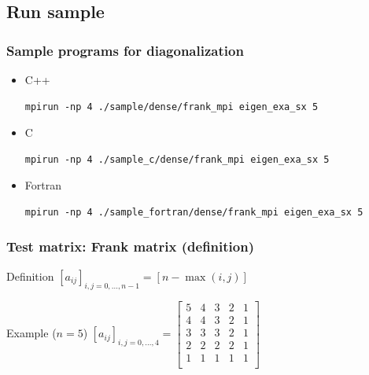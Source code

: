 \subsection{Run sample}

\begin{frame}[c,fragile]
  \frametitle{Sample programs for diagonalization}
  \begin{itemize}
  \item C++ 
\begin{lstlisting}[style=shstyle]
mpirun -np 4 ./sample/dense/frank_mpi eigen_exa_sx 5
\end{lstlisting}
  \item C 
\begin{lstlisting}[style=shstyle]
mpirun -np 4 ./sample_c/dense/frank_mpi eigen_exa_sx 5
\end{lstlisting}
  \item Fortran 
\begin{lstlisting}[style=shstyle]
mpirun -np 4 ./sample_fortran/dense/frank_mpi eigen_exa_sx 5
\end{lstlisting}

  \end{itemize}
\end{frame}

\begin{frame}[c,fragile]
  \frametitle{Test matrix: Frank matrix (definition)}
\begin{block}{Definition}
$[a_{ij}]_{i,j = {0, \dots, n-1}} = [ n - \max(i,j) ]$\\
\end{block}

\begin{block}{Example ($n=5$)}
$[a_{ij}]_{i,j = {0, \dots, 4}} =
\begin{bmatrix}
5 & 4 & 3 & 2 & 1 \\
4 & 4 & 3 & 2 & 1 \\
3 & 3 & 3 & 2 & 1 \\
2 & 2 & 2 & 2 & 1 \\
1 & 1 & 1 & 1 & 1 \\
\end{bmatrix}
$
\end{block}
\end{frame}

